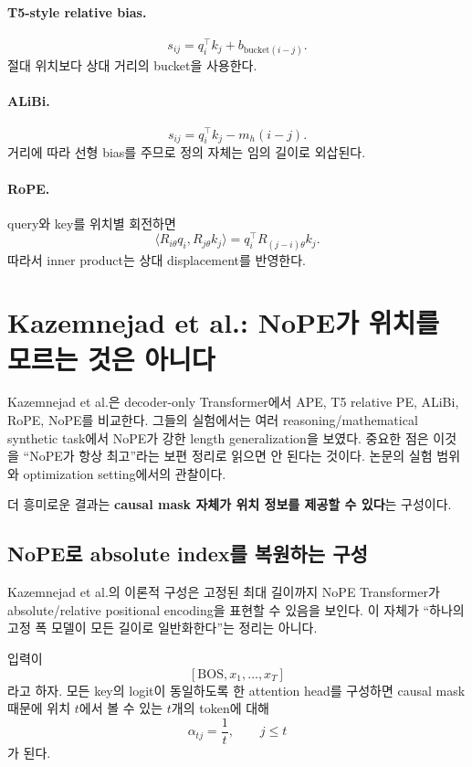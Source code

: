 \documentclass[11pt,a4paper,oneside,openany]{memoir}
\theoremstyle{definition}
\begin{document}
\paragraph{T5-style relative bias.}
\[
s_{ij}=q_i^\top k_j+b_{\mathrm{bucket}(i-j)}.
\]
절대 위치보다 상대 거리의 bucket을 사용한다.

\paragraph{ALiBi.}
\[
s_{ij}=q_i^\top k_j-m_h(i-j).
\]
거리에 따라 선형 bias를 주므로 정의 자체는 임의 길이로 외삽된다.

\paragraph{RoPE.}
query와 key를 위치별 회전하면
\[
\langle R_{i\theta}q_i,R_{j\theta}k_j\rangle
=q_i^\top R_{(j-i)\theta}k_j.
\]
따라서 inner product는 상대 displacement를 반영한다.

\section{Kazemnejad et al.: NoPE가 위치를 모르는 것은 아니다}

Kazemnejad et al.은 decoder-only Transformer에서 APE, T5 relative PE, ALiBi, RoPE, NoPE를 비교한다.
그들의 실험에서는 여러 reasoning/mathematical synthetic task에서 NoPE가 강한 length generalization을 보였다.
중요한 점은 이것을 ``NoPE가 항상 최고''라는 보편 정리로 읽으면 안 된다는 것이다.
논문의 실험 범위와 optimization setting에서의 관찰이다.

더 흥미로운 결과는 \textbf{causal mask 자체가 위치 정보를 제공할 수 있다}는 구성이다.

\subsection{NoPE로 absolute index를 복원하는 구성}

\begin{paperbox}
Kazemnejad et al.의 이론적 구성은 고정된 최대 길이까지 NoPE Transformer가 absolute/relative positional encoding을 표현할 수 있음을 보인다.
이 자체가 ``하나의 고정 폭 모델이 모든 길이로 일반화한다''는 정리는 아니다.
\end{paperbox}

입력이
\[
[\mathrm{BOS},x_1,\ldots,x_T]
\]
라고 하자. 모든 key의 logit이 동일하도록 한 attention head를 구성하면 causal mask 때문에 위치 $t$에서 볼 수 있는 $t$개의 token에 대해
\[
\alpha_{tj}=\frac1t,
\qquad j\le t
\]
가 된다.
\end{document}
